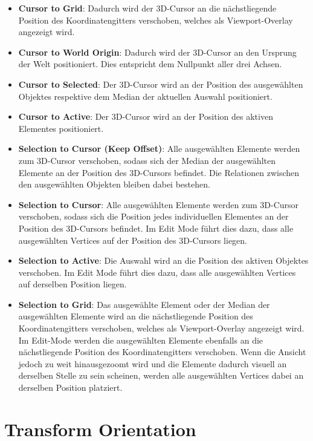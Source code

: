 \documentclass[
]{book}
\providecommand{\tightlist}{%
  \setlength{\itemsep}{0pt}\setlength{\parskip}{0pt}}\usepackage{longtable,booktabs,array}
\begin{document}
\begin{itemize}
\tightlist
\item
  \textbf{Cursor to Grid}: Dadurch wird der 3D-Cursor an die
  nächstliegende Position des Koordinatengitters verschoben, welches als
  Viewport-Overlay angezeigt wird.
\item
  \textbf{Cursor to World Origin}: Dadurch wird der 3D-Cursor an den
  Ursprung der Welt positioniert. Dies entspricht dem Nullpunkt aller
  drei Achsen.
\item
  \textbf{Cursor to Selected}: Der 3D-Cursor wird an der Position des
  ausgewählten Objektes respektive dem Median der aktuellen Auswahl
  positioniert.
\item
  \textbf{Cursor to Active}: Der 3D-Cursor wird an der Position des
  aktiven Elementes positioniert.
\item
  \textbf{Selection to Cursor (Keep Offset)}: Alle ausgewählten Elemente
  werden zum 3D-Cursor verschoben, sodass sich der Median der
  ausgewählten Elemente an der Position des 3D-Cursors befindet. Die
  Relationen zwischen den ausgewählten Objekten bleiben dabei bestehen.
\item
  \textbf{Selection to Cursor}: Alle ausgewählten Elemente werden zum
  3D-Cursor verschoben, sodass sich die Position jedes individuellen
  Elementes an der Position des 3D-Cursors befindet. Im Edit Mode führt
  dies dazu, dass alle ausgewählten Vertices auf der Position des
  3D-Cursors liegen.
\item
  \textbf{Selection to Active}: Die Auswahl wird an die Position des
  aktiven Objektes verschoben. Im Edit Mode führt dies dazu, dass alle
  ausgewählten Vertices auf derselben Position liegen.
\item
  \textbf{Selection to Grid}: Das ausgewählte Element oder der Median
  der ausgewählten Elemente wird an die nächstliegende Position des
  Koordinatengitters verschoben, welches als Viewport-Overlay angezeigt
  wird. Im Edit-Mode werden die ausgewählten Elemente ebenfalls an die
  nächstliegende Position des Koordinatengitters verschoben. Wenn die
  Ansicht jedoch zu weit hinausgezoomt wird und die Elemente dadurch
  visuell an derselben Stelle zu sein scheinen, werden alle ausgewählten
  Vertices dabei an derselben Position platziert.
\end{itemize}

\section{Transform Orientation}\label{transform-orientation}
\end{document}
